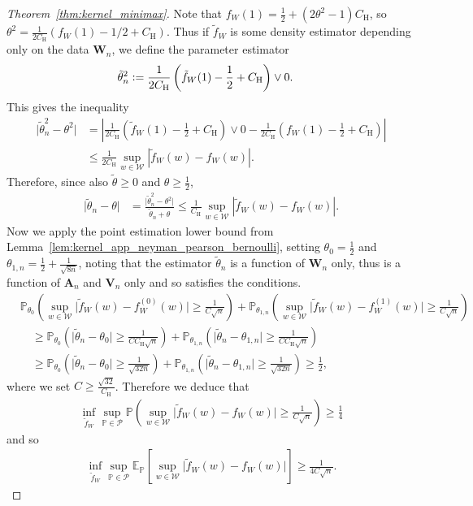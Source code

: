 \documentclass[11pt,lof]{puthesis}
\renewcommand{\P}{\ensuremath{\mathbb{P}}}
\newcommand{\E}{\ensuremath{\mathbb{E}}}
\newcommand{\rH}{\ensuremath{\mathrm{H}}}
\newcommand{\bW}{\ensuremath{\mathbf{W}}}
\newcommand{\bA}{\ensuremath{\mathbf{A}}}
\newcommand{\bV}{\ensuremath{\mathbf{V}}}
\newcommand{\cW}{\ensuremath{\mathcal{W}}}
\newcommand{\cP}{\ensuremath{\mathcal{P}}}
\theoremstyle{break}
\theoremstyle{proof}
\newtheorem{proof}{Proof}
\begin{document}
\begin{proof}[Theorem~\ref{thm:kernel_minimax}]
Note that $f_W(1) = \frac{1}{2} + (2\theta^2 - 1) C_\rH $,
so $\theta^2 = \frac{1}{2 C_\rH}(f_W(1) - 1/2 + C_\rH)$.
Thus if $\tilde f_W$ is some density estimator
depending only on the data $\bW_n$,
we define the parameter estimator
%
\begin{align*}
\tilde \theta_n^2
&\vcentcolon=
\frac{1}{2 C_\rH}\left(
\tilde f_W(1) - \frac{1}{2} + C_\rH
\right)
\vee 0.
\end{align*}
%
This gives the inequality
%
\begin{align*}
\big|
\tilde \theta_n^2 - \theta^2
\big|
&=
\left|
\frac{1}{2 C_\rH}\left(
\tilde f_W(1) - \frac{1}{2} + C_\rH
\right)
\vee 0
-
\frac{1}{2 C_\rH}\left(
f_W(1) - \frac{1}{2} + C_\rH
\right)
\right| \\
&\leq
\frac{1}{2 C_\rH}
\sup_{w \in \cW}
\left|
\tilde f_W(w) - f_W(w)
\right|.
\end{align*}
%
Therefore, since also $\tilde \theta \geq 0$
and $\theta \geq \frac{1}{2}$,
%
\begin{align*}
\big|
\tilde \theta_n - \theta
\big|
&=
\frac{\big|\tilde \theta_n^2 - \theta^2\big|}
{\tilde \theta_n + \theta}
\leq
\frac{1}{C_\rH}
\sup_{w \in \cW}
\left|
\tilde f_W(w) - f_W(w)
\right|.
\end{align*}
%
Now we apply the point estimation lower bound from
Lemma~\ref{lem:kernel_app_neyman_pearson_bernoulli},
setting $\theta_0 = \frac{1}{2}$
and $\theta_{1,n} = \frac{1}{2} + \frac{1}{\sqrt{8n}}$,
noting that the estimator
$\tilde \theta_n$
is a function of $\bW_n$ only,
thus is a function of $\bA_n$ and
$\bV_n$ only and so satisfies the conditions.
%
\begin{align*}
&\P_{\theta_0} \left(
\sup_{w \in \cW} \big| \tilde f_W(w) - f^{(0)}_W(w) \big|
\geq \frac{1}{C\sqrt{n}}
\right)
+ \P_{\theta_{1,n}} \left(
\sup_{w \in \cW} \big| \tilde f_W(w) - f^{(1)}_W(w) \big|
\geq \frac{1}{C\sqrt{n}}
\right) \\
&\quad\geq
\P_{\theta_0} \left(
\big| \tilde \theta_n - \theta_0 \big|
\geq \frac{1}{C C_\rH \sqrt{n}}
\right)
+ \P_{\theta_{1,n}} \left(
\big| \tilde \theta_n - \theta_{1,n} \big|
\geq \frac{1}{C C_\rH \sqrt{n}}
\right) \\
&\quad\geq
\P_{\theta_0} \left(
\big| \tilde \theta_n - \theta_0 \big|
\geq \frac{1}{\sqrt{32n}}
\right)
+ \P_{\theta_{1,n}} \left(
\big| \tilde \theta_n - \theta_{1,n} \big|
\geq \frac{1}{\sqrt{32n}}
\right)
\geq
\frac{1}{2},
\end{align*}
%
where we set $C \geq \frac{\sqrt{32}}{C_\rH}$.
Therefore we deduce that
%
\begin{align*}
\inf_{\tilde f_W}
\sup_{\P \in \cP}
\P\left(
\sup_{w \in \cW}
\big|
\tilde f_W(w) - f_W(w)
\big|
\geq
\frac{1}{C \sqrt n}
\right)
\geq \frac{1}{4}
\end{align*}
%
and so
%
\begin{align*}
\inf_{\tilde f_W}
\sup_{\P \in \cP}
\E_\P\left[
\sup_{w \in \cW}
\big|
\tilde f_W(w) - f_W(w)
\big|
\right]
\geq \frac{1}{4 C \sqrt{n}}.
\end{align*}


\end{proof}
\end{document}
